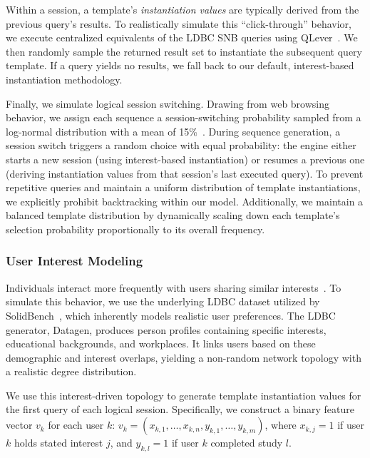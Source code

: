 Within a session, a template's \emph{instantiation values} are typically derived 
from the previous query's results. 
To realistically simulate this ``click-through'' 
behavior, we execute centralized equivalents of the LDBC SNB queries using 
QLever~\cite{bast2017qlever}. 
We then randomly sample the returned result set 
to instantiate the subsequent query template. 
If a query yields no results, 
we fall back to our default, interest-based instantiation methodology.

Finally, we simulate logical session switching. 
Drawing from web browsing behavior, we assign each sequence a session-switching probability sampled from a log-normal 
distribution with a mean of 15\%~\cite{meiss_whats_2009,schneider2009understanding}. 
During sequence generation, a session switch triggers a random choice with equal probability: the engine either starts a new 
session (using interest-based instantiation) or resumes a previous one (deriving instantiation values from that session's last executed query).
To prevent repetitive queries and maintain a uniform distribution of template instantiations, 
we explicitly prohibit backtracking within our model. 
Additionally, we maintain a balanced template distribution by dynamically 
scaling down each template's selection probability proportionally to its 
overall frequency.


\subsubsection{User Interest Modeling}
\label{ss:userinterests}

Individuals interact more frequently with users sharing similar interests~\cite{mitzlaff2013user}. 
To simulate this behavior, we use the underlying LDBC dataset utilized by SolidBench~\cite{erling2015ldbc}, 
which inherently models realistic user preferences. 
The LDBC generator, Datagen, produces person profiles containing specific interests, 
educational backgrounds, and workplaces. 
It links users based on these demographic and interest overlaps, 
yielding a non-random network topology with a realistic degree distribution.

We use this interest-driven topology to generate template instantiation values 
for the first query of each logical session. 
Specifically, we construct a binary feature vector $v_{k}$ for each user $k$:
$ v_{k} = (x_{k,1}, \dots, x_{k,n}, y_{k,1}, \dots, y_{k,m})$,
where $x_{k,j}=1$ if user $k$ holds stated interest $j$, and $y_{k,l}=1$ 
if user $k$ completed study $l$.

